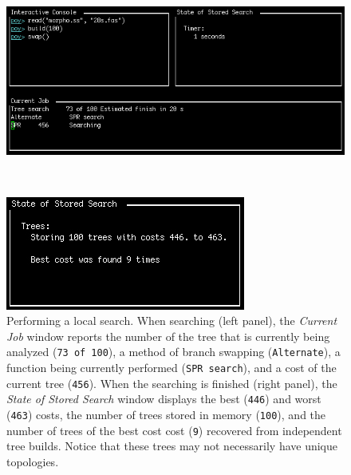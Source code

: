 {\begin{figure}
\centering
\begin{minipage}[c]{0.49\textwidth}
   		\includegraphics[width=\textwidth]{doc/figures/swap1.jpg}
\end{minipage}
\,
\begin{minipage}[c]{0.453\textwidth}
	   	\includegraphics[width=\textwidth]{doc/figures/swap2.jpg}
   	\end{minipage}
\caption{Performing a local search. When searching (left panel), the \emph{Current Job} window reports the number 
of the tree that is currently being analyzed (\texttt{73 of 100}), a method of branch swapping (\texttt{Alternate}), a 
function being currently performed (\texttt{SPR search}), and a cost of the current tree (\texttt{456}). When the 
searching is finished (right panel), the \emph{State of Stored Search} window displays the best (\texttt{446}) and 
worst (\texttt{463}) costs, the number of trees stored in memory (\texttt{100}), and the number of trees of the best 
cost cost (\texttt{9}) recovered from independent tree builds. Notice that these trees may not necessarily have unique topologies.} 
\label{fig:swapping}
\end{figure}

}
